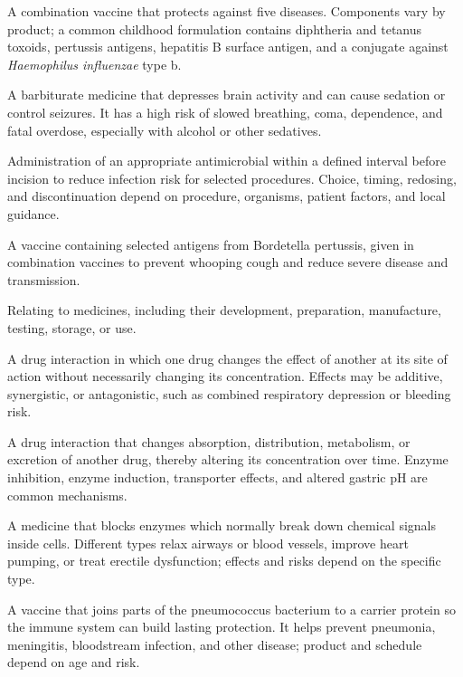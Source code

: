  A combination vaccine that protects against five diseases. Components vary by product; a common childhood formulation contains diphtheria and tetanus toxoids, pertussis antigens, hepatitis B surface antigen, and a conjugate against \textit{Haemophilus influenzae} type b.

 A barbiturate medicine that depresses brain activity and can cause sedation or control seizures. It has a high risk of slowed breathing, coma, dependence, and fatal overdose, especially with alcohol or other sedatives.


 Administration of an appropriate antimicrobial within a defined interval before incision
to reduce infection risk for selected procedures. Choice, timing, redosing, and
discontinuation depend on procedure, organisms, patient factors, and local guidance.

 A vaccine containing selected antigens from Bordetella pertussis, given in combination vaccines to prevent whooping cough and reduce severe disease and transmission.

 Relating to medicines, including their development, preparation, manufacture, testing, storage, or use.

 A drug interaction in which one drug changes the effect of another at its site of action
without necessarily changing its concentration. Effects may be additive, synergistic, or
antagonistic, such as combined respiratory depression or bleeding risk.

 A drug interaction that changes absorption, distribution, metabolism, or excretion of
another drug, thereby altering its concentration over time. Enzyme inhibition, enzyme
induction, transporter effects, and altered gastric pH are common mechanisms.

 A medicine that blocks enzymes which normally break down chemical signals inside cells. Different types relax airways or blood vessels, improve heart pumping, or treat erectile dysfunction; effects and risks depend on the specific type.


 A vaccine that joins parts of the pneumococcus bacterium to a carrier protein so the immune system can build lasting protection. It helps prevent pneumonia, meningitis, bloodstream infection, and other disease; product and schedule depend on age and risk.

